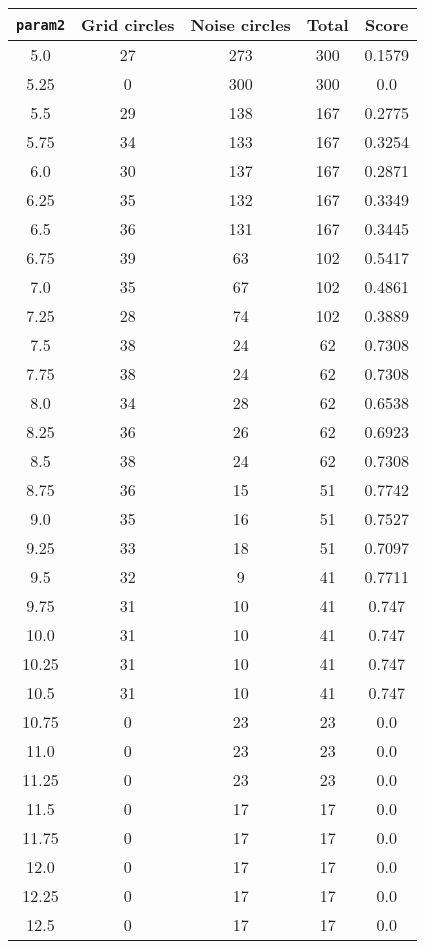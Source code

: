 \documentclass[letterpaper, 12pt]{article}
\begin{document}
\begin{longtable}{|c|c|c|c|c|}
\hline
\textbf{\texttt{param2}} & \textbf{Grid circles} & \textbf{Noise circles} & \textbf{Total} & \textbf{Score} \\
\hline
5.0 & 27 & 273 & 300 & 0.1579 \\
\hline
5.25 & 0 & 300 & 300 & 0.0 \\
\hline
5.5 & 29 & 138 & 167 & 0.2775 \\
\hline
5.75 & 34 & 133 & 167 & 0.3254 \\
\hline
6.0 & 30 & 137 & 167 & 0.2871 \\
\hline
6.25 & 35 & 132 & 167 & 0.3349 \\
\hline
6.5 & 36 & 131 & 167 & 0.3445 \\
\hline
6.75 & 39 & 63 & 102 & 0.5417 \\
\hline
7.0 & 35 & 67 & 102 & 0.4861 \\
\hline
7.25 & 28 & 74 & 102 & 0.3889 \\
\hline
7.5 & 38 & 24 & 62 & 0.7308 \\
\hline
7.75 & 38 & 24 & 62 & 0.7308 \\
\hline
8.0 & 34 & 28 & 62 & 0.6538 \\
\hline
8.25 & 36 & 26 & 62 & 0.6923 \\
\hline
8.5 & 38 & 24 & 62 & 0.7308 \\
\hline
8.75 & 36 & 15 & 51 & 0.7742 \\
\hline
9.0 & 35 & 16 & 51 & 0.7527 \\
\hline
9.25 & 33 & 18 & 51 & 0.7097 \\
\hline
9.5 & 32 & 9 & 41 & 0.7711 \\
\hline
9.75 & 31 & 10 & 41 & 0.747 \\
\hline
10.0 & 31 & 10 & 41 & 0.747 \\
\hline
10.25 & 31 & 10 & 41 & 0.747 \\
\hline
10.5 & 31 & 10 & 41 & 0.747 \\
\hline
10.75 & 0 & 23 & 23 & 0.0 \\
\hline
11.0 & 0 & 23 & 23 & 0.0 \\
\hline
11.25 & 0 & 23 & 23 & 0.0 \\
\hline
11.5 & 0 & 17 & 17 & 0.0 \\
\hline
11.75 & 0 & 17 & 17 & 0.0 \\
\hline
12.0 & 0 & 17 & 17 & 0.0 \\
\hline
12.25 & 0 & 17 & 17 & 0.0 \\
\hline
12.5 & 0 & 17 & 17 & 0.0 \\

\end{longtable}
\end{document}
